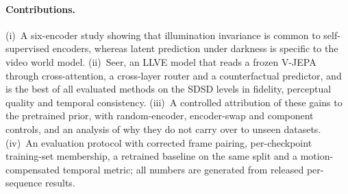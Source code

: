 \paragraph{Contributions.}
(i)~A six-encoder study showing that illumination invariance is common to self-supervised encoders, whereas latent prediction under darkness is specific to the video world model.
(ii)~Seer, an LLVE model that reads a frozen V-JEPA through cross-attention, a cross-layer router and a counterfactual predictor, and is the best of all evaluated methods on the SDSD levels in fidelity, perceptual quality and temporal consistency.
(iii)~A controlled attribution of these gains to the pretrained prior, with random-encoder, encoder-swap and component controls, and an analysis of why they do not carry over to unseen datasets.
(iv)~An evaluation protocol with corrected frame pairing, per-checkpoint training-set membership, a retrained baseline on the same split and a motion-compensated temporal metric; all numbers are generated from released per-sequence results.
